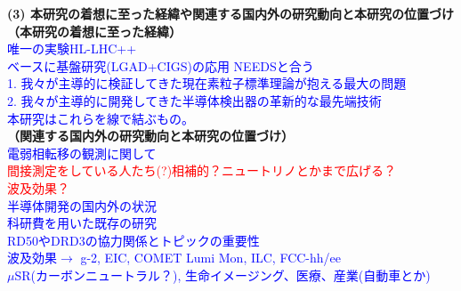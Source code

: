 \documentclass[11pt,a4j,dvipdfmx]{jarticle} 					%
\newcommand{\研究課題名}{新型半導体検出器を用いた真空の解明}
\newcommand{\研究機関名}{高エネルギー加速器研究機構}
\newcommand{\研究代表者氏名}{中村浩二}
\newcommand{\研究期間の最終元号年度}{10}  %
\newcommand{\TODO}[1]{\textcolor{red}{#1}}
\newcommand{\MEMO}[1]{\textcolor{blue}{#1}}
\begin{document}
\noindent\colorbox[gray]{0.9}{\textbf{(3) 本研究の着想に至った経緯や関連する国内外の研究動向と本研究の位置づけ}}\\
\noindent\textbf{（本研究の着想に至った経緯）}\\
\MEMO{
   唯一の実験HL-LHC++\\
  ベースに基盤研究(LGAD+CIGS)の応用 NEEDSと合う\\
  1. 我々が主導的に検証してきた現在素粒子標準理論が抱える最大の問題\\
  2. 我々が主導的に開発してきた半導体検出器の革新的な最先端技術\\
  本研究はこれらを線で結ぶもの。\\
}
\noindent\textbf{（関連する国内外の研究動向と本研究の位置づけ）}\\
\MEMO{
電弱相転移の観測に関して\\
    \hspace{1cm} \TODO{間接測定をしている人たち(?)相補的？ニュートリノとかまで広げる？}\\
    \hspace{1cm} \TODO{波及効果？}\\
半導体開発の国内外の状況\\
    \hspace{1cm} 科研費を用いた既存の研究\\
    \hspace{1cm} RD50やDRD3の協力関係とトピックの重要性\\
    \hspace{1cm} 波及効果$\to$ g-2, EIC, COMET Lumi Mon, ILC, FCC-hh/ee\\
    \hspace{3cm} $\mu$SR(カーボンニュートラル？), 生命イメージング、医療、産業(自動車とか)
}
\end{document}
